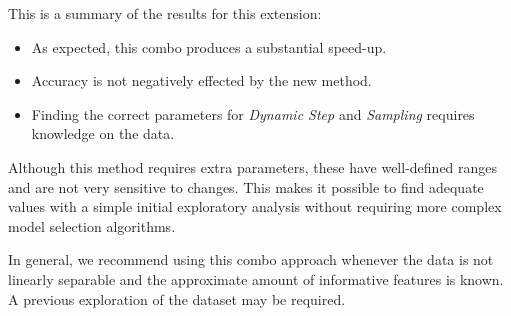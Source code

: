 This is a summary of the results for this extension:

\begin{itemize}
    \item As expected, this combo produces a substantial speed-up.
    \item Accuracy is not negatively effected by the new method.
    \item Finding the correct parameters for \emph{Dynamic Step} and \emph{Sampling} requires knowl\-edge on the data. 
\end{itemize}

Although this method requires extra parameters, these have well-defined ranges and are not very sensitive to changes. This makes it possible to find adequate values with a simple initial exploratory analysis without requiring more complex model selection algorithms. 

In general, we recommend using this combo approach whenever the data is not linearly separable and the approximate amount of informative features is known. A previous exploration of the dataset may be required.
